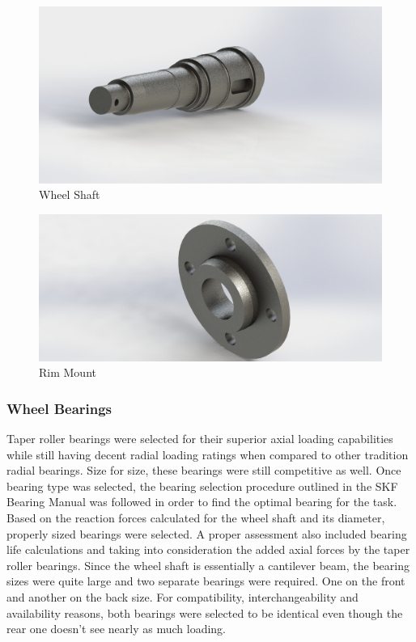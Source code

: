 \begin{figure}[h]\centering
	\includegraphics[width=.7\linewidth]{dom/shaft_iso_rndr.jpg}
	\caption{Wheel Shaft}
	\label{fig:wheel_shaft}
\end{figure}

\begin{figure}[h]\centering
	\includegraphics[width=.7\linewidth]{dom/rim_mount_iso_rndr.jpg}
	\caption{Rim Mount}
	\label{fig:rid_mount}
\end{figure}

\subsubsection{Wheel Bearings}
Taper roller bearings were selected for their superior axial loading capabilities while still having decent radial loading ratings when compared to other tradition radial bearings. Size for size, these bearings were still competitive as well. Once bearing type was selected, the bearing selection procedure outlined in the SKF Bearing Manual was followed in order to find the optimal bearing for the task. Based on the reaction forces calculated for the wheel shaft and its diameter, properly sized bearings were selected. A proper assessment also included bearing life calculations and taking into consideration the added axial forces by the taper roller bearings. Since the wheel shaft is essentially a cantilever beam, the bearing sizes were quite large and two separate bearings were required. One on the front and another on the back size. For compatibility, interchangeability and availability reasons, both bearings were selected to be identical even though the rear one doesn't see nearly as much loading.

